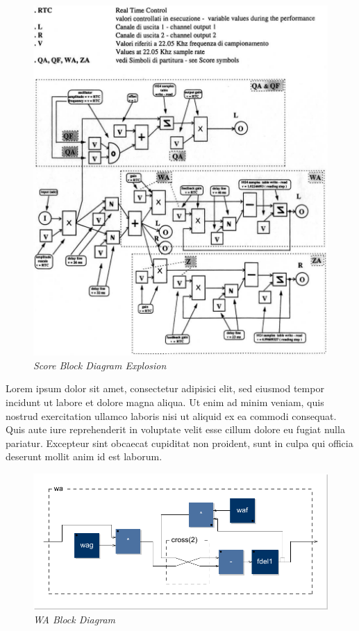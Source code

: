 \documentclass[twoside,a4paper]{article}
\begin{document}
\begin{figure}[ht]
\centerline{\includegraphics[scale=0.5]{img/2-comp}}
\caption{\label{ml-dia-exp}{\it Score Block Diagram Explosion}}
\end{figure}

Lorem ipsum dolor sit amet, consectetur adipisici elit, sed eiusmod tempor
incidunt ut labore et dolore magna aliqua. Ut enim ad minim veniam, quis
nostrud exercitation ullamco laboris nisi ut aliquid ex ea commodi consequat.
Quis aute iure reprehenderit in voluptate velit esse cillum dolore eu fugiat
nulla pariatur. Excepteur sint obcaecat cupiditat non proident, sunt in culpa
qui officia deserunt mollit anim id est laborum.

\begin{figure}[ht]
\centerline{\includegraphics[scale=0.5]{img/wa}}
\caption{\label{wa-block}{\it WA Block Diagram}}
\end{figure}
\end{document}
